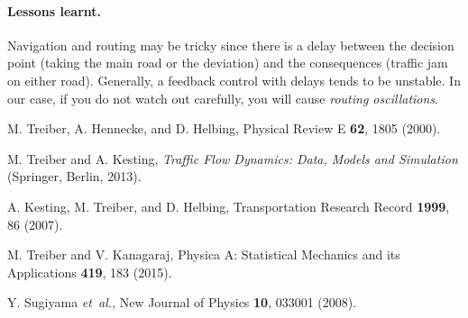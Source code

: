 \documentclass[paper=A4,pagesize=auto,11pt]{scrartcl}
\begin{document}
\paragraph{Lessons learnt.}
Navigation and routing may be tricky since there is a delay between
the decision point (taking the main road or the deviation) and the
consequences (traffic jam on either road). Generally, a feedback
control with delays tends to be unstable. In our case, if you do not watch out
carefully, you will cause \emph{routing oscillations}.


 
%

\begin{thebibliography}{1}

M. Treiber, A. Hennecke, and D. Helbing, Physical Review E {\bf 62},  1805
  (2000).

M. Treiber and A. Kesting, {\em Traffic Flow Dynamics: Data, Models and
  Simulation} (Springer, Berlin, 2013).

A. Kesting, M. Treiber, and D. Helbing, Transportation Research Record {\bf
  1999},  86  (2007).

M. Treiber and V. Kanagaraj, Physica A: Statistical Mechanics and its
  Applications {\bf 419},  183   (2015).

Y. Sugiyama {\it et~al.}, New Journal of Physics {\bf 10},  033001  (2008).

\end{thebibliography}
\end{document}
